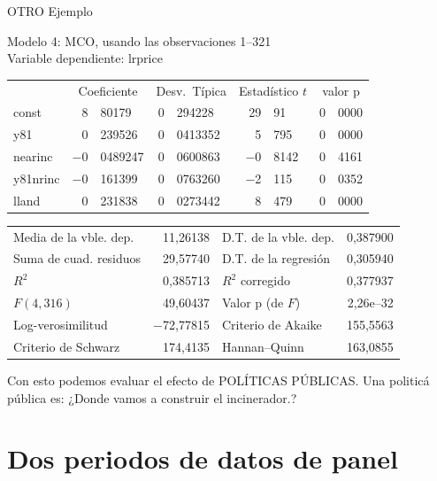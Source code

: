 OTRO Ejemplo


\begin{center}

Modelo 4: MCO, usando las observaciones 1--321\\
Variable dependiente: lrprice\\

\vspace{1em}

\begin{tabular}{lr@{,}lr@{,}lr@{,}lr@{,}l}
  &
 \multicolumn{2}{c}{Coeficiente} &
  \multicolumn{2}{c}{Desv.\ Típica} &
   \multicolumn{2}{c}{Estadístico $t$} &
    \multicolumn{2}{c}{valor p} \\[1ex]
const &
  8&80179 &
    0&294228 &
      29&91 &
        0&0000 \\
y81 &
  0&239526 &
    0&0413352 &
      5&795 &
        0&0000 \\
nearinc &
  $-$0&0489247 &
    0&0600863 &
      $-$0&8142 &
        0&4161 \\
y81nrinc &
  $-$0&161399 &
    0&0763260 &
      $-$2&115 &
        0&0352 \\
lland &
  0&231838 &
    0&0273442 &
      8&479 &
        0&0000 \\
\end{tabular}

\vspace{1ex}
\begin{tabular}{lrlr}
Media de la vble. dep. &  11,26138 & D.T. de la vble. dep. &  0,387900 \\
Suma de cuad. residuos &  29,57740 & D.T. de la regresión &  0,305940 \\
$R^2$ &  0,385713 & $R^2$ corregido &  0,377937 \\
$F(4, 316)$ &  49,60437 & Valor p (de $F$) &  2,26\textrm{e--32} \\
Log-verosimilitud & $-$72,77815 & Criterio de Akaike &  155,5563 \\
Criterio de Schwarz &  174,4135 & Hannan--Quinn &  163,0855 \\
\end{tabular}


\end{center}


Con esto podemos evaluar el efecto de POLÍTICAS PÚBLICAS. Una politicá pública es: ¿Donde vamos a construir el incinerador.?

\section{Dos periodos de datos de panel}

